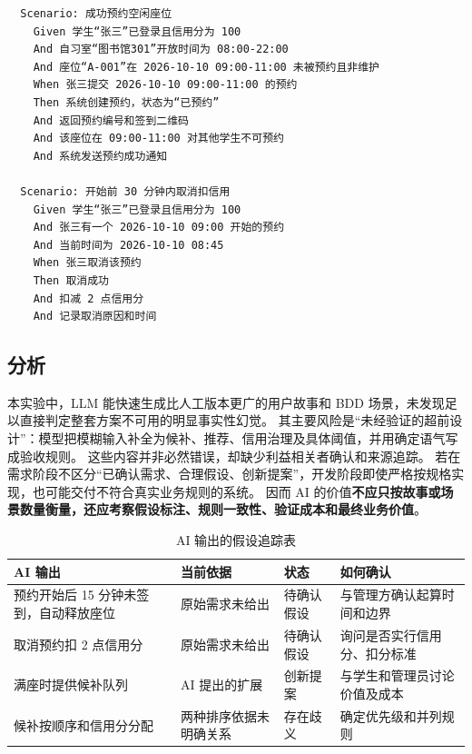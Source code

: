\documentclass[11pt,a4paper]{article}
\begin{document}
\begin{framed}
\begin{verbatim}
  Scenario: 成功预约空闲座位
    Given 学生“张三”已登录且信用分为 100
    And 自习室“图书馆301”开放时间为 08:00-22:00
    And 座位“A-001”在 2026-10-10 09:00-11:00 未被预约且非维护
    When 张三提交 2026-10-10 09:00-11:00 的预约
    Then 系统创建预约，状态为“已预约”
    And 返回预约编号和签到二维码
    And 该座位在 09:00-11:00 对其他学生不可预约
    And 系统发送预约成功通知

  Scenario: 开始前 30 分钟内取消扣信用
    Given 学生“张三”已登录且信用分为 100
    And 张三有一个 2026-10-10 09:00 开始的预约
    And 当前时间为 2026-10-10 08:45
    When 张三取消该预约
    Then 取消成功
    And 扣减 2 点信用分
    And 记录取消原因和时间

\end{verbatim}
\end{framed}

\subsection{分析}
本实验中，LLM 能快速生成比人工版本更广的用户故事和 BDD 场景，未发现足以直接判定整套方案不可用的明显事实性幻觉。
其主要风险是“未经验证的超前设计”：模型把模糊输入补全为候补、推荐、信用治理及具体阈值，并用确定语气写成验收规则。
这些内容并非必然错误，却缺少利益相关者确认和来源追踪。
若在需求阶段不区分“已确认需求、合理假设、创新提案”，开发阶段即使严格按规格实现，也可能交付不符合真实业务规则的系统。
因而 AI 的价值\textbf{不应只按故事或场景数量衡量，还应考察假设标注、规则一致性、验证成本和最终业务价值}。

\begin{table}[htbp]
    \centering
    \caption{AI 输出的假设追踪表}
    \begin{tabular}{@{}p{}p{}p{}p{}@{}}
        \toprule
        \textbf{AI 输出} & \textbf{当前依据} & \textbf{状态} & \textbf{如何确认} \\
        \midrule
        预约开始后 15 分钟未签到，自动释放座位 & 原始需求未给出 & 待确认假设 & 与管理方确认起算时间和边界 \\
        \midrule
        取消预约扣 2 点信用分 & 原始需求未给出 & 待确认假设 & 询问是否实行信用分、扣分标准 \\
        \midrule
        满座时提供候补队列 & AI 提出的扩展 & 创新提案 & 与学生和管理员讨论价值及成本 \\
        \midrule
        候补按顺序和信用分分配 & 两种排序依据未明确关系 & 存在歧义 & 确定优先级和并列规则 \\
        \bottomrule
    \end{tabular}
\end{table}
\end{document}
